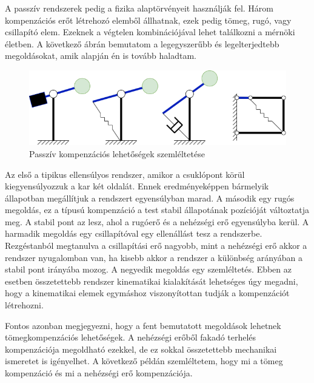 A passzív rendszerek pedig a fizika alaptörvényeit használják fel. Három kompenzációs erőt létrehozó elemből állhatnak, ezek pedig tömeg, rugó, vagy csillapító elem. Ezeknek a végtelen kombinációjával lehet találkozni a mérnöki életben. A következő ábrán bemutatom a legegyszerűbb és legelterjedtebb megoldásokat, amik alapján én is tovább haladtam.

\begin{figure}[!ht]
\centering
\includegraphics[width=125mm, keepaspectratio]{figures/Diagrammok/Kompenzacios_lehetosegek_passziv}
\caption{Passzív kompenzációs lehetőségek szemléltetése}
\label{fig:Kompenzacios_lehetosegek_passziv}
\end{figure}

Az első a tipikus ellensúlyos rendszer, amikor a csuklópont körül kiegyensúlyozzuk a kar két oldalát. Ennek eredményeképpen bármelyik állapotban megállítjuk a rendszert egyensúlyban marad. A második egy rugós megoldás, ez a típusú kompenzáció a test stabil állapotának pozícióját változtatja meg. A stabil pont az lesz, ahol a rugóerő és a nehézségi erő egyensúlyba kerül. A harmadik megoldás egy csillapítóval egy ellenállást tesz a rendszerbe. Rezgéstanból megtanulva a csillapítási erő nagyobb, mint a nehézségi erő akkor a rendszer nyugalomban van, ha kisebb akkor a rendszer a különbség arányában a stabil pont irányába mozog. A negyedik megoldás egy szemléltetés. Ebben az esetben összetettebb rendszer kinematikai kialakítását lehetséges úgy megadni, hogy a kinematikai elemek egymáshoz viszonyítottan tudják a kompenzációt létrehozni.

Fontos azonban megjegyezni, hogy a fent bemutatott megoldások lehetnek tömegkompenzációs lehetőségek. A nehézségi erőből fakadó terhelés kompenzációja megoldható ezekkel, de ez sokkal összetettebb mechanikai ismeretet is igényelhet. A következő példán szemléltetem, hogy mi a tömeg kompenzáció és mi a nehézségi erő kompenzációja.

